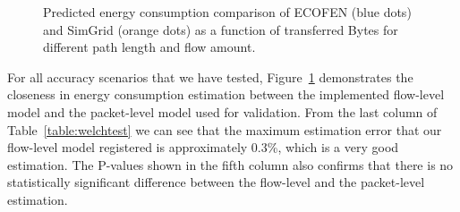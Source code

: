 \begin{figure}[htbp]
\centering

	\caption{Predicted energy consumption comparison of ECOFEN (blue dots) and SimGrid (orange dots) as a function of transferred Bytes for different path length and flow amount.}
	\label{fig:sgvsns3scenario}
\end{figure}
For all accuracy scenarios that we have tested, Figure~\ref{fig:sgvsns3scenario} demonstrates the closeness in energy consumption estimation between the implemented flow-level model and the packet-level model used for validation. From the last column of Table~\ref{table:welchtest} we can see that the maximum estimation error that our flow-level model registered is approximately 0.3\%, which is a very good estimation. The P-values shown in the fifth column also confirms that there is no statistically significant difference between the flow-level and the packet-level estimation.
